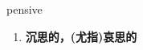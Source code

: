
\begin{frame}
{\huge pensive}
\begin{center}
\begin{enumerate}\Large
  \item \textbf{沉思的，(尤指)哀思的}
\end{enumerate}
\end{center}
\end{frame}
